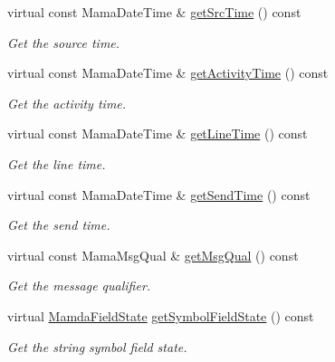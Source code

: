 \begin{CompactItemize}
virtual const Mama\-Date\-Time \& \hyperlink{classWombat_1_1MamdaConcreteBasicEvent_9456eab113f2c1b7d5cd7cc5183495d7}{get\-Src\-Time} () const 
\begin{CompactList}\small\item\em Get the source time. \item\end{CompactList}\item 
virtual const Mama\-Date\-Time \& \hyperlink{classWombat_1_1MamdaConcreteBasicEvent_ee6d9ec8ed5a8443b5f4812a7a5af0a3}{get\-Activity\-Time} () const 
\begin{CompactList}\small\item\em Get the activity time. \item\end{CompactList}\item 
virtual const Mama\-Date\-Time \& \hyperlink{classWombat_1_1MamdaConcreteBasicEvent_a1859e79dc57601841701399a7aad8eb}{get\-Line\-Time} () const 
\begin{CompactList}\small\item\em Get the line time. \item\end{CompactList}\item 
virtual const Mama\-Date\-Time \& \hyperlink{classWombat_1_1MamdaConcreteBasicEvent_ae7959d79489a7d4c036c0cfadda6764}{get\-Send\-Time} () const 
\begin{CompactList}\small\item\em Get the send time. \item\end{CompactList}\item 
virtual const Mama\-Msg\-Qual \& \hyperlink{classWombat_1_1MamdaConcreteBasicEvent_101e62bfb580c30b876cbb5014b22ab4}{get\-Msg\-Qual} () const 
\begin{CompactList}\small\item\em Get the message qualifier. \item\end{CompactList}\item 
virtual \hyperlink{namespaceWombat_93aac974f2ab713554fd12a1fa3b7d2a}{Mamda\-Field\-State} \hyperlink{classWombat_1_1MamdaConcreteBasicEvent_1fb58780b5232b8a07cc86c745721257}{get\-Symbol\-Field\-State} () const 
\begin{CompactList}\small\item\em Get the string symbol field state. \item\end{CompactList}\item 

\end{CompactItemize}
